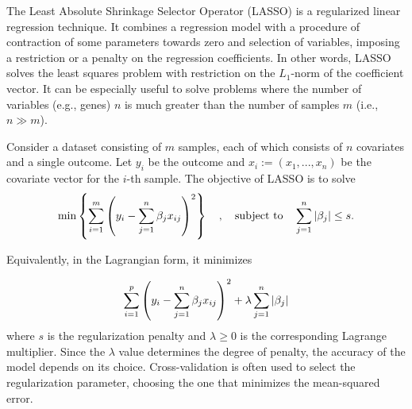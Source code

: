 The Least Absolute Shrinkage Selector Operator (LASSO) is a
regularized linear regression technique. It combines a regression
model with a procedure of contraction of some parameters towards zero
and selection of variables, imposing a restriction or a penalty on the
regression coefficients. In other words, LASSO solves the least
squares problem with restriction on the $ L_1$-norm of the coefficient
vector. It can be especially useful to solve problems where the number
of variables (e.g., genes) $ n $ is much greater than the number of
samples $ m $ (i.e., $ n \gg m $).

Consider a dataset consisting of $m$ samples, each of which consists
of $n$ covariates and a single outcome. Let $y_i$ be the outcome and
$x_i := (x_1,...,x_n)$ be the covariate vector for the $i$-th
sample. The objective of LASSO is to solve
%
\begin{equation}
\min \left\lbrace\sum_{i=1}^{m}{\left( y_i-\sum_{j=1}^n{\beta_j
    x_{ij}}\right)^2} \right\rbrace \quad , \quad \textrm{subject to}
\quad \sum_{j=1}^n\abs{\beta_j}\leq s.
\end{equation}

Equivalently, in the Lagrangian form, it minimizes

\begin{equation}
  \sum_{i=1}^{p}{\left( y_i-\sum_{j=1}^n{\beta_j x_{ij}}\right)^2} +
  \lambda \sum_{j=1}^n\abs{\beta_j}
\end{equation}
%
where $s$ is the regularization penalty and $\lambda \geq 0$ is the
corresponding Lagrange multiplier. Since the $\lambda$ value
determines the degree of penalty, the accuracy of the model depends on
its choice. Cross-validation is often used to select the
regularization parameter, choosing the one that minimizes the
mean-squared error.
